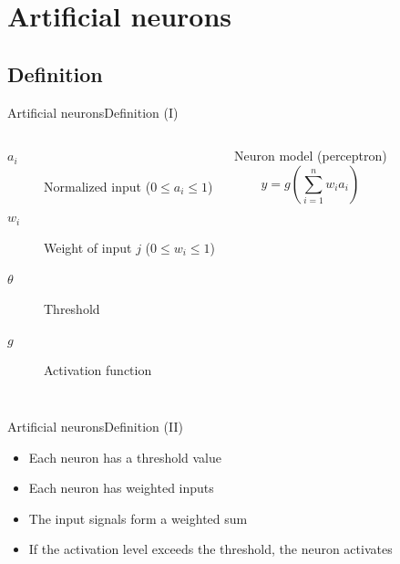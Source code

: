 \documentclass[10pt,compress]{beamer} %
\begin{document}
\section{Artificial neurons}

\subsection{Definition}

\begin{frame}{Artificial neurons}{Definition (I)}

    

	\bigskip
    \begin{columns}
		\begin{description}
		\item[$a_i$] Normalized input ($0 \le a_i \le 1$)
		\item[$w_{i}$] Weight of input $j$ ($0 \le w_{i} \le 1$)
		\item[$\theta$] Threshold
		\item[$g$] Activation function
		\end{description}

	   \begin{block}{Neuron model (perceptron)}
	   \vspace{-0.5cm}
	   \begin{equation*}
	   y=g\left( \sum_{i=1}^n w_{i} a_i \right)
	   \end{equation*}
	   \end{block}
    \end{columns}
\end{frame}


\begin{frame}{Artificial neurons}{Definition (II)}
	\begin{itemize}
	\item Each neuron has a threshold value
	\item Each neuron has weighted inputs
	\item The input signals form a weighted sum
	\item If the activation level exceeds the threshold, the neuron activates
	\end{itemize}
\end{frame}
\end{document}
